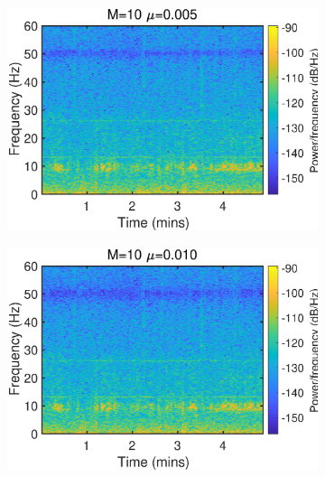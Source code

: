 \begin{figure}[htb]
\begin{subfigure}[b]{0.32\textwidth}
     \includegraphics[width=\textwidth]{fig/23/23d6.eps}
    \end{subfigure}
    \hspace{-0.4cm}
    \begin{subfigure}[b]{0.32\textwidth}
     \centering
     \includegraphics[width=\textwidth]{fig/23/23d7.eps}
    \end{subfigure}
    \\
    \hspace{-0.4cm} 
    \begin{subfigure}[b]{0.32\textwidth}
     \centering

\end{subfigure}
\end{figure}
